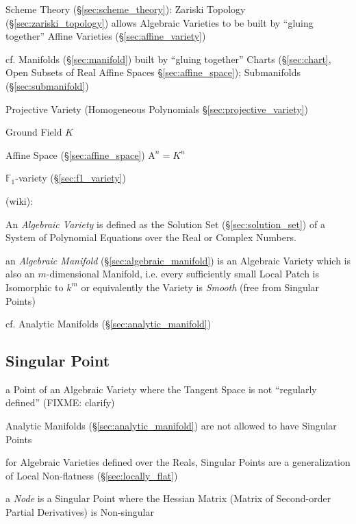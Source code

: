 Scheme Theory (\S\ref{sec:scheme_theory}): Zariski Topology
(\S\ref{sec:zariski_topology}) allows Algebraic Varieties to be built by
``gluing together'' Affine Varieties (\S\ref{sec:affine_variety})

cf. Manifolds (\S\ref{sec:manifold}) built by ``gluing together'' Charts
(\S\ref{sec:chart}, Open Subsets of Real Affine Spaces
\S\ref{sec:affine_space}); Submanifolds (\S\ref{sec:submanifold})

\fist Projective Variety (Homogeneous Polynomials
\S\ref{sec:projective_variety})

Ground Field $K$

Affine Space (\S\ref{sec:affine_space}) $\mathrm{A}^n = K^n$

\fist $\mathbb{F}_1$-variety (\S\ref{sec:f1_variety})


(wiki):

An \emph{Algebraic Variety} is defined as the Solution Set
(\S\ref{sec:solution_set}) of a System of Polynomial Equations over the Real or
Complex Numbers.

\fist an \emph{Algebraic Manifold} (\S\ref{sec:algebraic_manifold}) is an
Algebraic Variety which is also an $m$-dimensional Manifold, i.e. every
sufficiently small Local Patch is Isomorphic to $k^m$ or equivalently the
Variety is \emph{Smooth} (free from Singular Points)

cf. Analytic Manifolds (\S\ref{sec:analytic_manifold})



\subsection{Singular Point}\label{sec:singular_point}

a Point of an Algebraic Variety where the Tangent Space is not ``regularly
defined'' (FIXME: clarify)

Analytic Manifolds (\S\ref{sec:analytic_manifold}) are not allowed to have
Singular Points

for Algebraic Varieties defined over the Reals, Singular Points are a
generalization of Local Non-flatness (\S\ref{sec:locally_flat})

a \emph{Node} is a Singular Point where the Hessian Matrix (Matrix of
Second-order Partial Derivatives) is Non-singular



